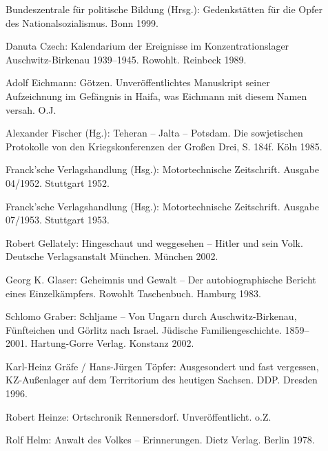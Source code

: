 \begin{description}
\item[]{Bundeszentrale für politische Bildung (Hrsg.): \glqq Gedenkstätten für die Opfer des Nationalsozialismus\grqq. Bonn 1999. }

\item[]{Danuta Czech: \glqq Kalendarium der Ereignisse im Konzentrationslager Auschwitz-Birkenau 1939--1945\grqq. Rowohlt. Reinbeck 1989.}

\item[]{Adolf Eichmann: \glqq Götzen\grqq. Unveröffentlichtes Manuskript seiner Aufzeichnung im Gefängnis in Haifa, was Eichmann mit diesem Namen versah. O.J.} 

\item[] {Alexander Fischer (Hg.): Teheran -- Jalta -- Potsdam. Die sowjetischen Protokolle von den Kriegskonferenzen der Großen Drei, S. 184f. Köln 1985.}

\item[]{Franck'sche Verlagshandlung (Hsg.): \glqq Motortechnische Zeitschrift\grqq. Ausgabe 04/1952. Stuttgart 1952.}

\item[]{Franck'sche Verlagshandlung (Hsg.): \glqq Motortechnische Zeitschrift\grqq. Ausgabe 07/1953. Stuttgart 1953.}

\item[]{Robert Gellately: \glqq Hingeschaut und weggesehen -- Hitler und sein Volk\grqq. Deutsche Verlagsanstalt München. München 2002.}

\item[]{Georg K. Glaser: \glqq Geheimnis und Gewalt -- Der autobiographische Bericht eines Einzelkämpfers\grqq. Rowohlt Taschenbuch. Hamburg 1983.}

\item[]{Schlomo Graber: \glqq Schljame -- Von Ungarn durch Auschwitz-Birkenau, Fünfteichen und Görlitz nach Israel. Jüdische Familiengeschichte. 1859--2001\grqq. Hartung-Gorre Verlag. Konstanz 2002.}

\item[]{Karl-Heinz Gräfe / Hans-Jürgen Töpfer: \glqq Ausgesondert und fast vergessen, KZ-Außenlager auf dem Territorium des heutigen Sachsen\grqq. DDP. Dresden 1996.}

\item[]{Robert Heinze: \glqq Ortschronik Rennersdorf\grqq. Unveröffentlicht. o.Z. }

\item[]{Rolf Helm: \glqq Anwalt des Volkes -- Erinnerungen\grqq. Dietz Verlag. Berlin 1978.}


\end{description}
